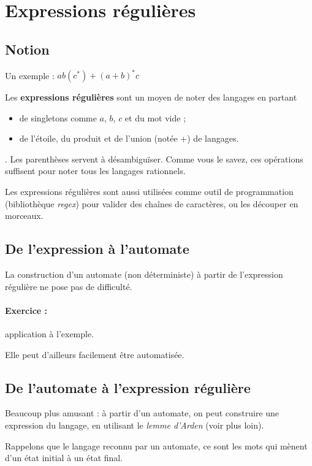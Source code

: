 \documentclass[10pt,twoside]{article}
\begin{document}
\clearpage
\section{Expressions régulières}

\subsection{Notion}

Un exemple : $ab(c^*) + (a+b)^*c$

Les \textbf{expressions régulières}
 sont un moyen de noter des langages en
partant
\begin{itemize}
\item de singletons comme $a$, $b$, $c$ et du mot vide ;
\item de l'étoile, du produit et de l'union (notée +) de langages.
\end{itemize}.
Les parenthèses servent à désambiguïser.
Comme vous le savez, ces opérations suffisent
 pour noter tous les langages 
rationnels.

Les expressions régulières sont aussi utilisées comme outil de 
programmation (bibliothèque \emph{regex}) pour valider des chaînes
de caractères, ou les découper en morceaux.

\subsection{De l'expression à l'automate}

La construction d'un automate (non déterministe) à partir
de l'expression régulière ne pose pas de difficulté.

\paragraph{Exercice :} application à l'exemple.

Elle peut d'ailleurs facilement être automatisée.

\subsection{De l'automate à l'expression régulière}

Beaucoup plus amusant : à partir d'un automate, on peut construire
une expression du langage, en utilisant le \emph{lemme d'Arden} 
(voir plus loin).

Rappelons que le langage reconnu par un automate, ce sont les mots
qui mènent d'un état initial  à un état final.
\end{document}
